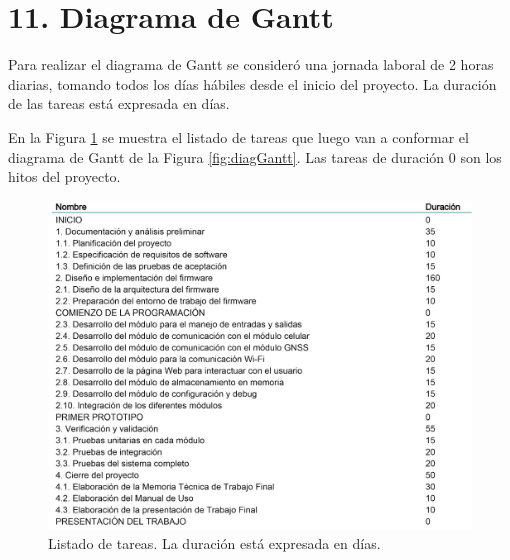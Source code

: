 \documentclass[
11pt, %
]{charter}
\begin{document}
%
%
%

%



\section{11. Diagrama de Gantt}
\label{sec:gantt}

Para realizar el diagrama de Gantt se consideró una jornada laboral de 2 horas diarias, tomando todos los días hábiles desde el inicio del proyecto. La duración de las tareas está expresada en días.

En la Figura \ref{fig:listaTareas} se muestra el listado de tareas que luego van a conformar el diagrama de Gantt de la Figura \ref{fig:diagGantt}. Las tareas de duración 0 son los hitos del proyecto.

\begin{figure}[htpb]
\centering 
\includegraphics[width=1\textwidth]{./Figuras/lista_tareas.pdf}
\caption{Listado de tareas. La duración está expresada en días.}
\label{fig:listaTareas}
\end{figure} 
\end{document}
